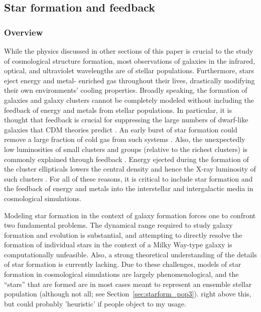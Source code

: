 \subsection{Star formation and feedback}
\label{sec.ov.star}

\subsubsection{Overview}

While the physics discussed in other sections of this paper is crucial
to the study of cosmological structure formation, most observations of
galaxies in the infrared, optical, and ultraviolet wavelengths are of
stellar populations.  Furthermore, stars eject energy and metal-
enriched gas throughout their lives, drastically modifying their own
environments' cooling properties.  Broadly speaking, the formation of
galaxies and galaxy clusters cannot be completely modeled without
including the feedback of energy and metals from stellar populations.
In particular, it is thought that feedback is crucial for suppressing
the large numbers of dwarf-like galaxies that CDM theories predict
\citep{1991ApJ...381...14L,1991ApJ...379...52W}.  An early burst of
star formation could remove a large fraction of cold gas from such
systems \citep{1978MNRAS.183..341W,1991ApJ...367...45C}.  Also, the
unexpectedly low luminosities of small clusters and groups (relative
to the richest clusters) is commonly explained through feedback
\citep{1991ApJ...383..104K}.  Energy ejected during the formation of
the cluster ellipticals lowers the central density and hence the X-ray
luminosity of such clusters \citep{1997ApJ...484L..21C}.  For all of
these reasons, it is critical to include star formation and the
feedback of energy and metals into the interstellar and intergalactic
media in cosmological simulations.

Modeling star formation in the context of galaxy formation forces one
to confront two fundamental problems. The dynamical range required to
study galaxy formation and evolution is substantial, and attempting to
directly resolve the formation of individual stars in the context of a
Milky Way-type galaxy is computationally unfeasible.  Also, a strong
theoretical understanding of the details of star formation is
currently lacking.  Due to these challenges, models of star formation
in cosmological simulations are largely phenomenological, and the
``stars'' that are formed are in most cases meant to represent an
ensemble stellar population (although not all; see
Section~\ref{sec:starform_pop3}).  %
right above this, but could probably %
'heuristic' if people object to my usage.

